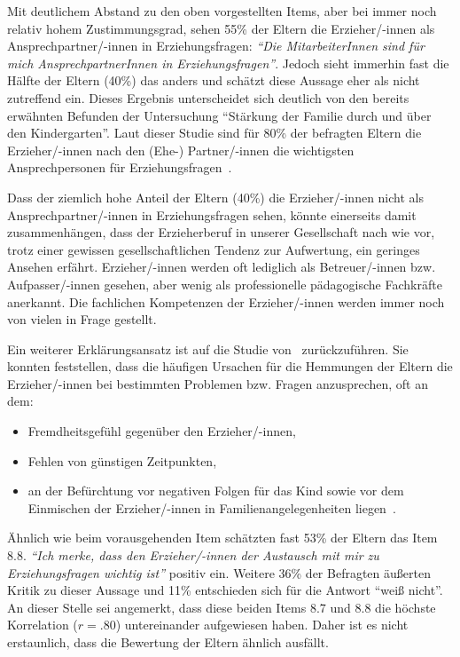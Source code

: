 \documentclass[12pt,a4paper]{article}
\begin{document}
Mit deutlichem Abstand zu den oben vorgestellten Items, aber bei immer noch relativ hohem Zustimmungsgrad, sehen 55\% der Eltern die Erzieher/-innen als Ansprechpartner/-innen in Erziehungsfragen: \textit{"`Die MitarbeiterInnen sind für mich AnsprechpartnerInnen in Erziehungsfragen"'}. Jedoch sieht immerhin fast die Hälfte der Eltern (40\%) das anders und schätzt diese Aussage eher als nicht zutreffend ein. Dieses Ergebnis unterscheidet sich deutlich von den bereits %
erwähnten Befunden der Untersuchung "`Stärkung der Familie durch und über den Kindergarten"'. Laut dieser Studie sind für 80\% der befragten Eltern die Erzieher/-innen nach den (Ehe-) Partner/-innen die wichtigsten Ansprechpersonen für Erziehungsfragen~\parencite[S.~10]{Froelich}. 
 
Dass der ziemlich hohe Anteil der Eltern (40\%) die Erzieher/-innen nicht als Ansprechpartner/-innen in Erziehungsfragen sehen, könnte einerseits damit zusammenhängen, dass der Erzieherberuf in unserer Gesellschaft nach wie vor, trotz einer gewissen gesellschaftlichen Tendenz zur Aufwertung, ein geringes Ansehen erfährt. Erzieher/-innen werden oft lediglich als Betreuer/-innen bzw. Aufpasser/-innen gesehen, aber wenig als professionelle pädagogische Fachkräfte anerkannt. Die fachlichen Kompetenzen der Erzieher/-innen werden immer noch von vielen in Frage gestellt. 

Ein weiterer Erklärungsansatz ist auf die Studie von~\textcite{Sturzbecher} zurückzuführen. Sie konnten feststellen, dass die häufigen Ursachen für die Hemmungen der Eltern die Erzieher/-innen bei bestimmten Problemen bzw. Fragen anzusprechen, oft an dem: 
\begin{itemize} 
\item Fremdheitsgefühl gegenüber den Erzieher/-innen, 
\item Fehlen von günstigen Zeitpunkten, 
\item an der Befürchtung vor negativen Folgen für das Kind sowie vor dem Einmischen der Erzieher/-innen in Familienangelegenheiten liegen~\parencite[S.~193-233]{Sturzbecher}.
\end{itemize}

	Ähnlich wie beim vorausgehenden Item schätzten fast 53\% der Eltern das Item 8.8. \textit{"`Ich merke, dass den Erzieher/-innen der Austausch mit mir zu Erziehungsfragen wichtig ist"'} positiv ein. Weitere 36\% der Befragten äußerten Kritik zu dieser Aussage und 11\% entschieden sich für die Antwort "`weiß nicht"'. An dieser Stelle sei angemerkt, dass diese beiden Items 8.7 und 8.8 die höchste Korrelation ($r = .80$) untereinander aufgewiesen haben. Daher ist es nicht erstaunlich, dass die Bewertung der Eltern ähnlich ausfällt. 
\end{document}
